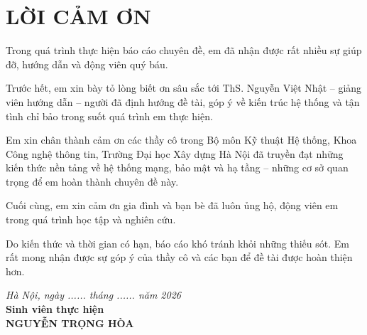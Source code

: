 \chapter*{LỜI CẢM ƠN}

Trong quá trình thực hiện báo cáo chuyên đề, em đã nhận được rất nhiều sự
giúp đỡ, hướng dẫn và động viên quý báu.

Trước hết, em xin bày tỏ lòng biết ơn sâu sắc tới ThS. Nguyễn Việt Nhật --
giảng viên hướng dẫn -- người đã định hướng đề tài, góp ý về kiến trúc hệ
thống và tận tình chỉ bảo trong suốt quá trình em thực hiện.

Em xin chân thành cảm ơn các thầy cô trong Bộ môn Kỹ thuật Hệ thống, Khoa Công
nghệ thông tin, Trường Đại học Xây dựng Hà Nội đã truyền đạt những kiến thức
nền tảng về hệ thống mạng, bảo mật và hạ tầng -- những cơ sở quan trọng để em
hoàn thành chuyên đề này.

Cuối cùng, em xin cảm ơn gia đình và bạn bè đã luôn ủng hộ, động viên em trong
quá trình học tập và nghiên cứu.

Do kiến thức và thời gian có hạn, báo cáo khó tránh khỏi những thiếu sót. Em
rất mong nhận được sự góp ý của thầy cô và các bạn để đề tài được hoàn thiện
hơn.

\vspace{1.5cm}
\begin{flushright}
\textit{Hà Nội, ngày ...... tháng ...... năm 2026}\\[0.3cm]
\textbf{Sinh viên thực hiện}\\[1.8cm]
\textbf{NGUYỄN TRỌNG HÒA}
\end{flushright}
